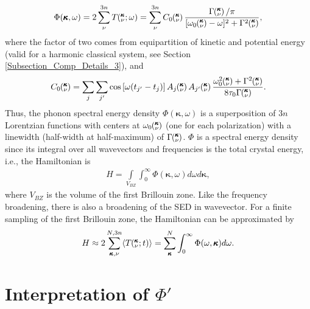 \documentclass[12pt,twocolumn,iop]{/usr/share/texmf-texlive/tex/latex/iop/iopart}[/usr/share/texmf-texlive/tex/latex/iop/]
\newcommand{\kvt}{\mspace{-4.0mu}\left(\mspace{-8.0mu}\begin{smallmatrix}&\pmb{\kappa} \\&\nu\end{smallmatrix}\mspace{-2.0mu};t\right)}
\newcommand{\kvw}{\mspace{-4.0mu}\left(\mspace{-8.0mu}\begin{smallmatrix}&\pmb{\kappa} \\&\nu\end{smallmatrix}\mspace{-2.0mu};\omega\right)}
\newcommand{\kv}{\mspace{-4.0mu}\left(\mspace{-8.0mu}\begin{smallmatrix}&\pmb{\kappa} \\&\nu\end{smallmatrix}\mspace{-3.0mu}\right)}
\begin{document}
\begin{equation}\label{A:E:Lorentzian_NMD}
\begin{split}
\Phi(\pmb{\kappa},\omega) = 2\sum_{\nu}^{3n} T\kvw=\sum_{\nu}^{3n}C_0\kv\frac{\Gamma\kv/\pi}{[\omega_0\kv-\omega]^2+\Gamma^2\kv},
\end{split}
\end{equation}
where the factor of two comes from equipartition of kinetic and potential energy (valid for a harmonic classical system, see Section \ref{Subsection_Comp_Details_3}), and
\begin{equation}\label{A:E:C_0}
\begin{split}
C_0\kv = \sum_j\sum_{j'}\cos\left[\omega (t_{j'}-t_j)\right]A_j\kv A_{j'}\kv\frac{\omega_0^2\kv+\Gamma^2\kv}{8\tau_0\Gamma\kv}.
\end{split}
\end{equation}
Thus, the phonon spectral energy density $\Phi(\pmb{\kappa},\omega)$ is a superposition of $3n$ Lorentzian
functions with centers at $\omega_0\kv$ (one for each polarization) with a linewidth (half-width at half-maximum) of
$\Gamma\kv$. $\Phi$ is a spectral energy density since its integral over all wavevectors and frequencies is the total crystal energy, i.e., the Hamiltonian is
\begin{equation}\label{A:E:equipartition}
\begin{split}
H=\int\limits_{V_{BZ}} \int_{0}^{\infty}\Phi(\pmb{\kappa},\omega)d\omega d\pmb{\kappa},
\end{split}
\end{equation}
where $V_{BZ}$ is the volume of the first Brillouin zone.  Like the frequency broadening, there is also a broadening of the SED in wavevector.\cite{turneythesis} For a finite sampling of the first Brillouin zone, the Hamiltonian can be approximated by
\begin{equation}\label{A:E:equipartition}
\begin{split}
H \approx 2\sum_{\pmb{\kappa},\nu}^{N,3n}\langle T\kvt\rangle = \sum_{\pmb{\kappa}}^N \int_{0}^{\infty}\Phi(\omega,\pmb{\kappa})d\omega.
\end{split}
\end{equation}

\section{\label{Appendix_B}Interpretation of $\Phi'$}
\end{document}
